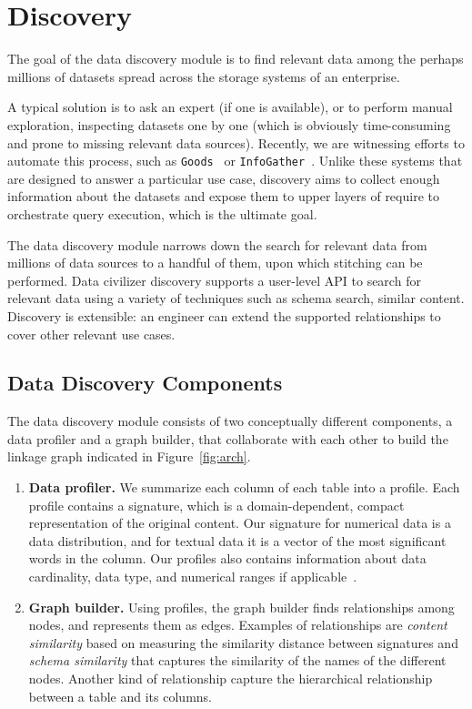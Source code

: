 \section{Discovery}
\label{sec:discovery}

The goal of the data discovery module is to find relevant data among the perhaps millions of datasets spread across the storage systems of an enterprise. 

A typical solution is to ask an expert (if one is available), or to perform manual exploration, inspecting datasets one by one (which is obviously time-consuming and prone to missing relevant data sources). Recently, we are witnessing efforts to automate this process, such as \texttt{Goods}~\cite{DBLP:conf/sigmod/HalevyKNOPRW16} or \texttt{InfoGather}~\cite{ref}. Unlike these systems that are designed to answer a particular use case, discovery aims to collect enough information about the datasets and expose them to upper layers of \dcv require to orchestrate query execution, which is the ultimate goal.

The data discovery module narrows down the search for relevant data from millions of data sources to a handful of them, upon which stitching can be performed. Data civilizer discovery supports a user-level API to search for relevant data using a variety of techniques such as schema search, similar content. Discovery is extensible: an engineer can extend the supported relationships to cover other relevant use cases.

\subsection{Data Discovery Components}

The data discovery module consists of two conceptually different components, a data profiler and a graph builder, that collaborate with each other to build the linkage graph indicated in Figure~\ref{fig:arch}.

\begin{enumerate}
\item {\bf Data profiler.} We summarize each column of each table into a profile. Each profile contains a signature, which is a domain-dependent, compact representation of the original content. Our signature for numerical data is a data distribution, and for textual data it is a vector of the most significant words in the column. Our profiles also contains information about data cardinality, data type, and numerical ranges if applicable~\cite{profiling_survey}.  

\item {\bf Graph builder.} Using profiles, the graph builder finds relationships among nodes, and represents them as edges. Examples of relationships are \emph{content similarity} based on measuring the similarity distance between signatures and \emph{schema similarity} that captures the similarity of the names of the different nodes. Another kind of relationship capture the hierarchical relationship between a table and its columns.

\end{enumerate}


